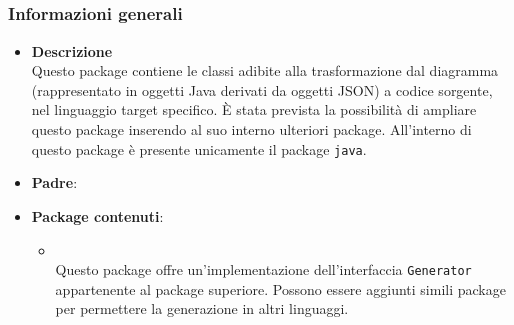\subsection{}
\label{\nogloxy{swedesigner::server::generator}}
\subsubsection{Informazioni generali}
\begin{itemize}
\item \textbf{Descrizione}\\
Questo package contiene le classi adibite alla trasformazione dal diagramma (rappresentato in oggetti Java derivati da oggetti JSON) a codice sorgente, nel linguaggio target specifico. È stata prevista la possibilità di ampliare questo package inserendo al suo interno ulteriori package. All'interno di questo package è presente unicamente il package \texttt{java}.
\item \textbf{Padre}: \hyperref[\nogloxy{swedesigner::server}]{}
\item \textbf{Package contenuti}:
\begin{itemize}
\item \hyperref[\nogloxy{swedesigner::server::generator::java}]{}\\
Questo package offre un'implementazione dell'interfaccia \texttt{Generator} appartenente al package superiore. Possono essere aggiunti simili package per permettere la generazione in altri linguaggi.
\end{itemize}
\end{itemize}
